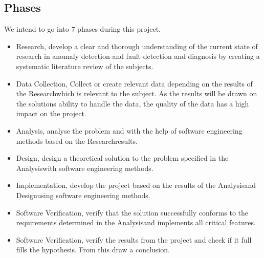 \documentclass[a4paper,8pt]{article}
\newcommand{\Phases}{7 }
\newcommand{\phaseq}{Research}
\newcommand{\phasew}{Data Collection}
\newcommand{\phasee}{Analysis}
\newcommand{\phaser}{Design}
\newcommand{\phaset}{Implementation}
\newcommand{\phasey}{Software Verification}
\begin{document}
	\subsection{Phases}
	We intend to go into \Phases phases during this project.
		\begin{itemize}
			\item \phaseq, develop a clear and thorough understanding of the current state of research in anomaly detection and fault detection and diagnosis by creating a systematic literature review of the subjects.
			\item \phasew, Collect or create relevant data depending on the results of the \phaseq which is relevant to the subject. As the results will be drawn on the solutions ability to handle the data, the quality of the data has a high impact on the project.
			\item \phasee, analyse the problem and with the help of software engineering methods based on the \phaseq \space results.
			\item \phaser, design a theoretical solution to the problem specified in the \phasee with software engineering methods.
			\item \phaset, develop the project based on the results of the \phasee and \phaser using software engineering methods.
			\item \phasey, verify that the solution successfully conforms to the requirements determined in the \phasee and implements all critical features.
			\item \phasey, verify the results from the project and check if it full fills the hypothesis. From this draw a conclusion.
		\end{itemize}
	
\end{document}
